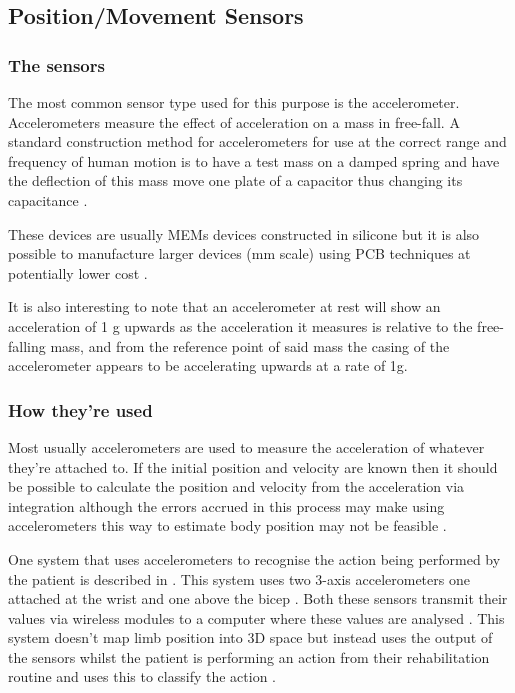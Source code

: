 \documentclass[journal]{IEEEtran}
\begin{document}
\subsection{Position/Movement Sensors}
\subsubsection{The sensors}
The most common sensor type used for this purpose is the accelerometer. Accelerometers measure 
the effect of acceleration on a mass in free-fall. A standard construction method for accelerometers 
for use at the correct range and frequency of human motion is to have a test mass on a damped spring 
and have the deflection of this mass move one plate of a capacitor thus changing its capacitance \cite{lowCostACs}.

These devices are usually MEMs devices constructed in silicone but it is also possible to manufacture 
larger devices (mm scale) using PCB techniques at potentially lower cost \cite{lowCostACs}.

It is also interesting to note that an accelerometer at rest will show an acceleration of 1 g upwards as 
the acceleration it measures is relative to the free-falling mass, and from the reference point of said 
mass the casing of the accelerometer appears to be accelerating upwards at a rate of 1g.

\subsubsection{How they're used}
Most usually accelerometers are used to measure the acceleration of whatever they're attached to. 
If the initial position and velocity are known then it should be possible to calculate the position and velocity 
from the acceleration via integration although the errors accrued in this process may make using accelerometers 
this way to estimate body position may not be feasible \cite{ACfeasable}.

One system that uses accelerometers to recognise the action being performed by the patient 
is described in \cite{ACSVM}. This system uses two 3-axis accelerometers 
one attached at the wrist and one above the bicep \cite{ACSVM}. Both these sensors transmit their 
values via wireless modules to a computer where these values are analysed \cite{ACSVM}. This system 
doesn't map limb position into 3D space but instead uses the output of the sensors whilst the 
patient is performing an action from their rehabilitation routine and uses this to classify the 
action \cite{ACSVM}.
\end{document}
